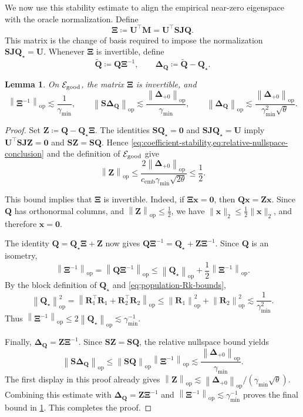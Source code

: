 \documentclass[11pt]{article}
\newtheorem{lemma}{Lemma}
\newcommand{\trans}{\top}
\newcommand{\opn}[1]{\left\lVert #1\right\rVert_{\mathrm{op}}}
\newcommand{\cE}{\mathcal{E}}
\newcommand{\bze}{\bm{0}}
\newcommand{\gmin}{\gamma_{\min}}
\newcommand{\cemb}{c_{\mathrm{emb}}}
\begin{document}
We now use this stability estimate to align the empirical near-zero
eigenspace with the oracle normalization. Define
\[
  \bm\Xi
  \coloneqq \bm U^\trans \bm M = 
  \bm U^\trans\bm S\bm J\bm Q.
\]
This matrix is the change of basis required to impose the normalization
$\bm S\bm J\bm Q_\star=\bm U$. Whenever $\bm\Xi$ is invertible, define
\[
  \widetilde{\bm Q}
  \coloneqq
  \bm Q\bm\Xi^{-1},
  \qquad
  \bm\Delta_{\bm Q}
  \coloneqq
  \widetilde{\bm Q}-\bm Q_\star.
\]

\begin{lemma}
\label{lem:calibration}
On $\cE_{\rm good}$, the matrix $\bm\Xi$ is invertible, and
\[
  \opn{\bm\Xi^{-1}}
  \lesssim
  \frac{1}{\gmin},
  \qquad
  \opn{\bm S\bm\Delta_{\bm Q}}
  \lesssim
  \frac{\opn{\bm\Delta_{+0}}}{\gmin},
  \qquad
  \opn{\bm\Delta_{\bm Q}}
  \lesssim
  \frac{\opn{\bm\Delta_{+0}}}
       {\gmin^2\sqrt\theta}.
\]
\end{lemma}

\begin{proof}
Set
$\bm Z\coloneqq\bm Q-\bm Q_\star\bm\Xi$. The identities
$\bm S\bm Q_\star=\bze$ and
$\bm S\bm J\bm Q_\star=\bm U$ imply
$\bm U^\trans\bm S\bm J\bm Z=\bze$ and
$\bm S\bm Z=\bm S\bm Q$. Hence
\cref{eq:coefficient-stability,eq:relative-nullspace-conclusion} and the
definition of $\cE_{\rm good}$ give
\[
  \opn{\bm Z}
  \le
  \frac{2\opn{\bm\Delta_{+0}}}
       {\cemb\gmin\sqrt{2\theta}}
  \le
  \frac12.
\]

This bound implies that $\bm\Xi$ is invertible. Indeed, if
$\bm\Xi\bm x=\bze$, then $\bm Q\bm x=\bm Z\bm x$. Since $\bm Q$ has
orthonormal columns, and $\opn{\bm Z} \leq \frac12$, we have
$\|\bm x\|_2\le\frac12\|\bm x\|_2$, and therefore $\bm x=\bze$.

The identity
$\bm Q=\bm Q_\star\bm\Xi+\bm Z$ now gives
$\bm Q\bm\Xi^{-1}
=\bm Q_\star+\bm Z\bm\Xi^{-1}$. Since $\bm Q$ is an isometry,
\[
  \opn{\bm\Xi^{-1}}
  =
  \opn{\bm Q\bm\Xi^{-1}}
  \le
  \opn{\bm Q_\star}
  +
  \frac12\opn{\bm\Xi^{-1}}.
\]
By the block definition of $\bm Q_\star$ and
\cref{eq:population-Rk-bounds},
\[
  \opn{\bm Q_\star}^2
  =
  \opn{\bm R_1^\trans\bm R_1+\bm R_2^\trans\bm R_2}
  \le
  \opn{\bm R_1}^2+\opn{\bm R_2}^2
  \lesssim
  \frac{1}{\gmin^2}.
\]
Thus
$\opn{\bm\Xi^{-1}}\le2\opn{\bm Q_\star}\lesssim\gmin^{-1}$.

Finally, $\bm\Delta_{\bm Q}=\bm Z\bm\Xi^{-1}$. Since
$\bm S\bm Z=\bm S\bm Q$, the relative nullspace bound yields
\[
  \opn{\bm S\bm\Delta_{\bm Q}}
  \le
  \opn{\bm S\bm Q}\opn{\bm\Xi^{-1}}
  \lesssim
  \frac{\opn{\bm\Delta_{+0}}}{\gmin}.
\]
The first display in this proof already gives
$\opn{\bm Z}\lesssim
\opn{\bm\Delta_{+0}}/(\gmin\sqrt\theta)$.
Combining this estimate with
$\bm\Delta_{\bm Q}=\bm Z\bm\Xi^{-1}$ and
$\opn{\bm\Xi^{-1}}\lesssim\gmin^{-1}$ proves the final bound in
\cref{lem:calibration}. This completes the proof.
\end{proof}
\end{document}
